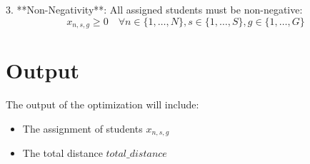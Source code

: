 \documentclass{article}
\begin{document}
3. **Non-Negativity**:
   All assigned students must be non-negative:
   \[
   x_{n,s,g} \geq 0 \quad \forall n \in \{1, \ldots, N\}, s \in \{1, \ldots, S\}, g \in \{1, \ldots, G\}
   \]

\section*{Output}

The output of the optimization will include:
\begin{itemize}
    \item The assignment of students \( x_{n,s,g} \)
    \item The total distance \( total\_distance \)
\end{itemize}
\end{document}
